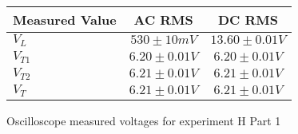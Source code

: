 \begin{figure}[H]    \centering    \begin{tabular}{|l|c|c|}
        \hline
        Measured Value & AC RMS & DC RMS \\
        \hline
        $V_{L}$ & $530\pm 10\unit{mV}$ & $13.60\pm 0.01\unit{V}$ \\
        $V_{T1}$ & $6.20\pm 0.01\unit{V}$ & $6.20\pm 0.01\unit{V}$ \\
        $V_{T2}$ & $6.21\pm 0.01\unit{V}$ & $6.21\pm 0.01\unit{V}$ \\
        $V_{T}$ & $6.21\pm 0.01\unit{V}$ & $6.21\pm 0.01\unit{V}$ \\
        \hline
    \end{tabular}    \caption{Oscilloscope measured voltages for experiment H Part 1}\end{figure}